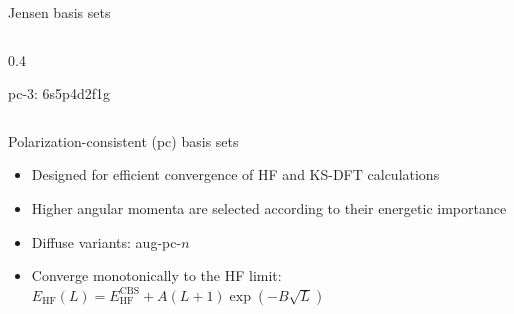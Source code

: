 \documentclass[aspectratio=169,9pt]{beamer}
\begin{document}
\begin{frame}{Jensen basis sets}
\begin{columns}
\begin{column}[t]{0.4\textwidth}
\begin{block}{pc-3: \small 6s5p4d2f1g}
        	\end{block}
		\end{column}
	\end{columns}
	\begin{block}{Polarization-consistent (pc) basis sets}
    	\begin{itemize}
    		\item Designed for efficient convergence of HF and KS-DFT calculations
    		\item Higher angular momenta are selected according to their energetic importance
    		\item Diffuse variants: aug-pc-$n$
    		\item Converge monotonically to the HF limit:
    		\quad $\boxed{E_\text{HF}(L) = E_\text{HF}^\text{CBS} + A(L+1) \exp(-B \sqrt{L})}$
    	\end{itemize}
	\end{block}
\end{frame}
\end{document}

